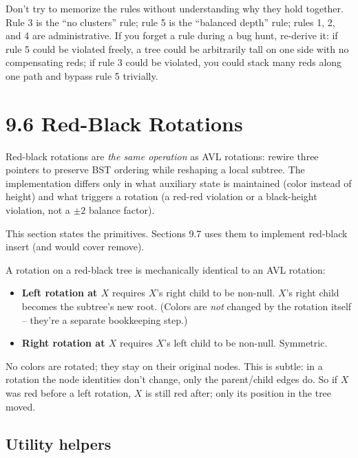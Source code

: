 \documentclass[11pt]{article}
\begin{document}
\begin{warnbox}
Don't try to memorize the rules without understanding why they hold together. Rule 3 is the ``no clusters'' rule; rule 5 is the ``balanced depth'' rule; rules 1, 2, and 4 are administrative. If you forget a rule during a bug hunt, re-derive it: if rule 5 could be violated freely, a tree could be arbitrarily tall on one side with no compensating reds; if rule 3 could be violated, you could stack many reds along one path and bypass rule 5 trivially.
\end{warnbox}

\section{9.6 Red-Black Rotations}

Red-black rotations are \emph{the same operation} as AVL rotations: rewire three pointers to preserve BST ordering while reshaping a local subtree. The implementation differs only in what auxiliary state is maintained (color instead of height) and what triggers a rotation (a red-red violation or a black-height violation, not a $\pm 2$ balance factor).

This section states the primitives. Sections 9.7 uses them to implement red-black insert (and would cover remove).

\begin{defnbox}
A rotation on a red-black tree is mechanically identical to an AVL rotation:
\begin{itemize}[leftmargin=*]
    \item \textbf{Left rotation at $X$} requires $X$'s right child to be non-null. $X$'s right child becomes the subtree's new root. (Colors are \emph{not} changed by the rotation itself -- they're a separate bookkeeping step.)
    \item \textbf{Right rotation at $X$} requires $X$'s left child to be non-null. Symmetric.
\end{itemize}
\end{defnbox}

No colors are rotated; they stay on their original nodes. This is subtle: in a rotation the node identities don't change, only the parent/child edges do. So if $X$ was red before a left rotation, $X$ is still red after; only its position in the tree moved.

\subsection*{Utility helpers}
\end{document}
